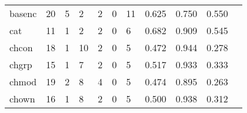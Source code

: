 \begin{longtable}{lp{1.2cm}p{1.2cm}p{1.2cm}p{1.2cm}p{1.2cm}p{1.2cm}p{1.2cm}p{1.2cm}p{1.2cm}p{1.2cm}}
basenc    &                                    20 &                                                  5 &                                                  2 &                                                  2 &                                                  0 &                                                 11 &                                              0.625 &                                              0.750 &                                              0.550 \\
cat       &                                    11 &                                                  1 &                                                  2 &                                                  2 &                                                  0 &                                                  6 &                                              0.682 &                                              0.909 &                                              0.545 \\
chcon     &                                    18 &                                                  1 &                                                 10 &                                                  2 &                                                  0 &                                                  5 &                                              0.472 &                                              0.944 &                                              0.278 \\
chgrp     &                                    15 &                                                  1 &                                                  7 &                                                  2 &                                                  0 &                                                  5 &                                              0.517 &                                              0.933 &                                              0.333 \\
chmod     &                                    19 &                                                  2 &                                                  8 &                                                  4 &                                                  0 &                                                  5 &                                              0.474 &                                              0.895 &                                              0.263 \\
chown     &                                    16 &                                                  1 &                                                  8 &                                                  2 &                                                  0 &                                                  5 &                                              0.500 &                                              0.938 &                                              0.312 \\

\end{longtable}
